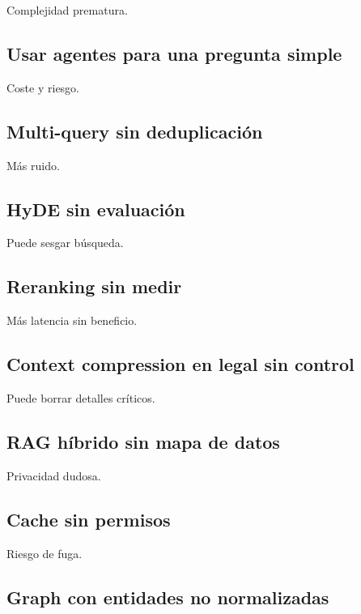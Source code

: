 Complejidad prematura.

\subsection{Usar agentes para una pregunta
simple}\label{usar-agentes-para-una-pregunta-simple}

Coste y riesgo.

\subsection{Multi-query sin
deduplicación}\label{multi-query-sin-deduplicaciuxf3n}

Más ruido.

\subsection{HyDE sin evaluación}\label{hyde-sin-evaluaciuxf3n}

Puede sesgar búsqueda.

\subsection{Reranking sin medir}\label{reranking-sin-medir-1}

Más latencia sin beneficio.

\subsection{Context compression en legal sin
control}\label{context-compression-en-legal-sin-control}

Puede borrar detalles críticos.

\subsection{RAG híbrido sin mapa de
datos}\label{rag-huxedbrido-sin-mapa-de-datos}

Privacidad dudosa.

\subsection{Cache sin permisos}\label{cache-sin-permisos}

Riesgo de fuga.

\subsection{Graph con entidades no
normalizadas}\label{graph-con-entidades-no-normalizadas}

